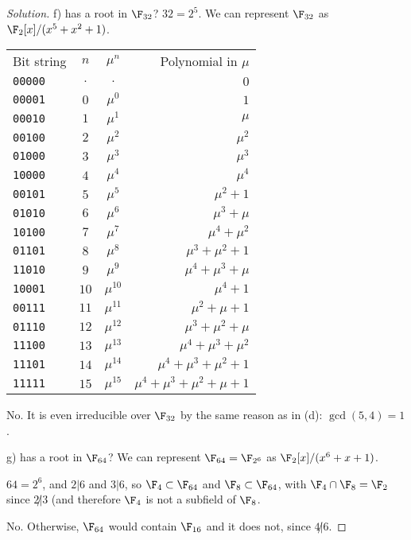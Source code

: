 \begin{proof}[Solution]
f) has a root in $\F_{32}$?
$32 = 2^5$.
We can represent $\F_{32}$ as $\F_2[x]/(x^5 + x^2 + 1)$.
\begin{table}
\begin{tabular}{l|c|c|r}
Bit string & $n$ & $\mu^n$ & Polynomial in $\mu$\\
\texttt{00000} & $ .$ & $.        $ & $0$\\
\texttt{00001} & $ 0$ & $\mu^{ 0}$ & $1$\\
\texttt{00010} & $ 1$ & $\mu^{ 1}$ & $\mu$\\ 
\texttt{00100} & $ 2$ & $\mu^{ 2}$ & $\mu^2$\\
\texttt{01000} & $ 3$ & $\mu^{ 3}$ & $\mu^3$\\
\texttt{10000} & $ 4$ & $\mu^{ 4}$ & $\mu^4$\\
\texttt{00101} & $ 5$ & $\mu^{ 5}$ & $\mu^2 + 1$\\
\texttt{01010} & $ 6$ & $\mu^{ 6}$ & $\mu^3 + \mu$\\
\texttt{10100} & $ 7$ & $\mu^{ 7}$ & $\mu^4 + \mu^2$\\
\texttt{01101} & $ 8$ & $\mu^{ 8}$ & $\mu^3 + \mu^2 + 1$\\
\texttt{11010} & $ 9$ & $\mu^{ 9}$ & $\mu^4 + \mu^3 + \mu$\\
\texttt{10001} & $10$ & $\mu^{10}$ & $\mu^4 + 1$\\
\texttt{00111} & $11$ & $\mu^{11}$ & $\mu^2 + \mu + 1$\\
\texttt{01110} & $12$ & $\mu^{12}$ & $\mu^3 + \mu^2 + \mu$\\
\texttt{11100} & $13$ & $\mu^{13}$ & $\mu^4 + \mu^3 + \mu^2$\\
\texttt{11101} & $14$ & $\mu^{14}$ & $\mu^4 + \mu^3 + \mu^2 + 1$\\
\texttt{11111} & $15$ & $\mu^{15}$ & $\mu^4 + \mu^3 + \mu^2 + \mu + 1$\\
\end{tabular}
\end{table}

{\color{blue}No. It is even irreducible over $\F_{32}$ by the same reason as in (d): $\gcd(5,4) = 1$.}

g) has a root in $\F_{64}$?
We can represent $\F_{64} = \F_{2^6}$ as $\F_2[x]/(x^6 + x + 1)$.

$64 = 2^6$, and $2 | 6$ and $3 | 6$, so $\F_4 \subset \F_{64}$ and $\F_8 \subset \F_{64}$, with $\F_{4} \cap \F_{8} = \F_2$ since $2 \not| 3$ (and therefore $\F_4$ is not a subfield of $\F_8$.

{\color{blue}No. Otherwise, $\F_{64}$ would contain $\F_{16}$ and it does not, since $4 \not|6$.}


\end{proof}
